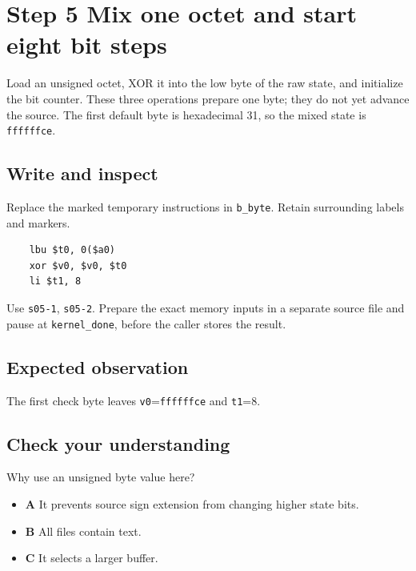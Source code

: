 \section{Step 5 Mix one octet and start eight bit steps}\label{crc-s05}

Load an unsigned octet, XOR it into the low byte of the raw state, and initialize the bit counter. These three operations prepare one byte; they do not yet advance the source. The first default byte is hexadecimal 31, so the mixed state is \texttt{ffffffce}.

\subsection{Write and inspect}
Replace the marked temporary instructions in \texttt{b\_byte}. Retain surrounding labels and markers.

\begin{verbatim}
    lbu $t0, 0($a0)
    xor $v0, $v0, $t0
    li $t1, 8
\end{verbatim}

Use \texttt{s05-1}, \texttt{s05-2}. Prepare the exact memory inputs in a separate source file and pause at \texttt{kernel\_done}, before the caller stores the result.

\subsection{Expected observation}
The first check byte leaves \texttt{v0}=\texttt{ffffffce} and \texttt{t1}=8.

\subsection{Check your understanding}
Why use an unsigned byte value here?

\begin{itemize}
  \item \textbf{A} It prevents source sign extension from changing higher state bits.
  \item \textbf{B} All files contain text.
  \item \textbf{C} It selects a larger buffer.
\end{itemize}
